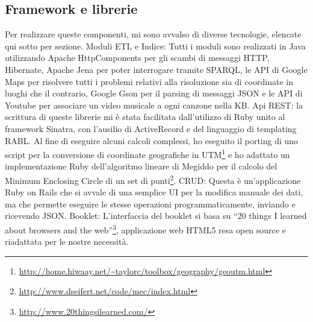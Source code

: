 \documentclass[sigproc-sp.tex]{subfiles}
\begin{document}
\subsection{Framework e librerie}
Per realizzare queste componenti, mi sono avvalso di diverse tecnologie, elencate qui sotto per sezione.
Moduli ETL e Indice: Tutti i moduli sono realizzati in Java utilizzando Apache HttpComponents per gli scambi di messaggi HTTP, Hibernate, Apache Jena per poter interrogare tramite SPARQL, le API di Google Maps per risolvere tutti i problemi relativi alla risoluzione sia di coordinate in luoghi che il contrario, Google Gson per il parsing di messaggi JSON e le API di Youtube per associare un video musicale a ogni canzone nella KB.
Api REST: la scrittura di queste librerie mi è stata facilitata dall’utilizzo di Ruby unito al framework Sinatra, con l’ausilio di ActiveRecord e del linguaggio di templating RABL. Al fine di eseguire alcuni calcoli complessi, ho eseguito il porting di uno script per la conversione di coordinate geografiche in UTM\footnote{\url{http://home.hiwaay.net/~taylorc/toolbox/geography/geoutm.html}} e ho adattato un implementazione Ruby dell’algoritmo lineare di Megiddo per il calcolo del Minimum Enclosing Circle di un set di punti\footnote{\url{http://www.dseifert.net/code/mec/index.html}}.
CRUD: Questa è un’applicazione Ruby on Rails che si avvale di una semplice UI per la modifica manuale dei dati, ma che permette eseguire le stesse operazioni programmaticamente, inviando e ricevendo JSON.
Booklet: L’interfaccia del booklet si basa su “20 things I learned about browsers and the web”\footnote{\url{http://www.20thingsilearned.com/}}, applicazione web HTML5 resa open source e riadattata per le nostre necessità.
\end{document}
